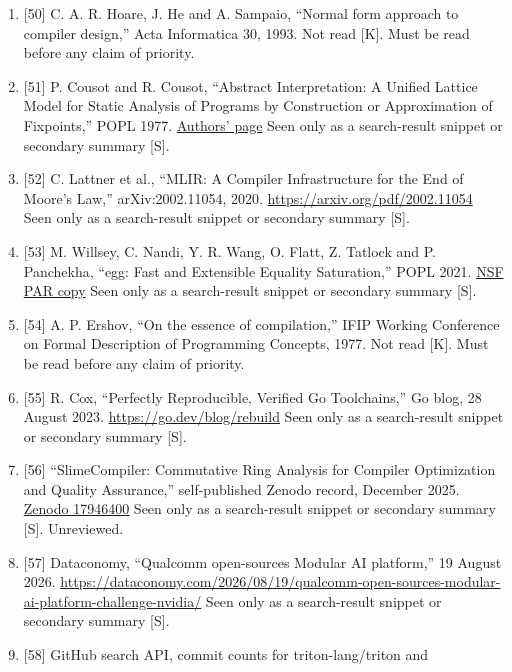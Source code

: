 \documentclass[10pt,letterpaper]{article}
\begin{document}
\begin{enumerate}
  pp.~41--67.
  \href{https://ftp.math.utah.edu/pub/tex/bib/idx/tcs1980/18/1/41_67.html}{Bibliographic
  record} Seen only as a search-result snippet or secondary summary
  {[}S{]}.
\item
  {[}50{]} C. A. R. Hoare, J. He and A. Sampaio, ``Normal form approach
  to compiler design,'' Acta Informatica 30, 1993. Not read {[}K{]}.
  Must be read before any claim of priority.
\item
  {[}51{]} P. Cousot and R. Cousot, ``Abstract Interpretation: A Unified
  Lattice Model for Static Analysis of Programs by Construction or
  Approximation of Fixpoints,'' POPL 1977.
  \href{https://cs.nyu.edu/~pmc309/COUSOTpapers/POPL77.shtml}{Authors'
  page} Seen only as a search-result snippet or secondary summary
  {[}S{]}.
\item
  {[}52{]} C. Lattner et al., ``MLIR: A Compiler Infrastructure for the
  End of Moore's Law,'' arXiv:2002.11054, 2020.
  \url{https://arxiv.org/pdf/2002.11054} Seen only as a search-result
  snippet or secondary summary {[}S{]}.
\item
  {[}53{]} M. Willsey, C. Nandi, Y. R. Wang, O. Flatt, Z. Tatlock and P.
  Panchekha, ``egg: Fast and Extensible Equality Saturation,'' POPL
  2021. \href{https://par.nsf.gov/servlets/purl/10224915}{NSF PAR copy}
  Seen only as a search-result snippet or secondary summary {[}S{]}.
\item
  {[}54{]} A. P. Ershov, ``On the essence of compilation,'' IFIP Working
  Conference on Formal Description of Programming Concepts, 1977. Not
  read {[}K{]}. Must be read before any claim of priority.
\item
  {[}55{]} R. Cox, ``Perfectly Reproducible, Verified Go Toolchains,''
  Go blog, 28 August 2023. \url{https://go.dev/blog/rebuild} Seen only
  as a search-result snippet or secondary summary {[}S{]}.
\item
  {[}56{]} ``SlimeCompiler: Commutative Ring Analysis for Compiler
  Optimization and Quality Assurance,'' self-published Zenodo record,
  December 2025. \href{https://zenodo.org/records/17946400}{Zenodo
  17946400} Seen only as a search-result snippet or secondary summary
  {[}S{]}. Unreviewed.
\item
  {[}57{]} Dataconomy, ``Qualcomm open-sources Modular AI platform,'' 19
  August 2026.
  \url{https://dataconomy.com/2026/08/19/qualcomm-open-sources-modular-ai-platform-challenge-nvidia/}
  Seen only as a search-result snippet or secondary summary {[}S{]}.
\item
  {[}58{]} GitHub search API, commit counts for triton-lang/triton and

\end{enumerate}
\end{document}
